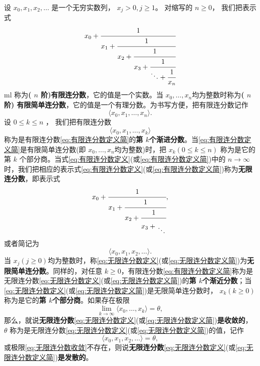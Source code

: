 \begin{definition}
	设 \( x_0, x_1, x_2, \dots \) 是一个无穷实数列， \( x_j > 0, j \geqslant 1 \)。 对缩写的 \( n \geqslant 0 \)， 我们把表示式
	\begin{equation}\label{eq:有限连分数定义}
		x_0 +
		\cfrac{1}{x_1 +
			\cfrac{1}{x_2 +
				\cfrac{1}{x_3 +
					\cfrac{1}{\ddots +
						\cfrac{1}{x_n}
					}}}}
	\end{equation}
	ml	称为\textbf{( \( n \) 阶)有限连分数}，它的值是一个实数。当 \( x_0, \dots, x_n
	\)均为整数时称为\textbf{( \( n \)阶) 有限简单连分数}，它的值是一个有理分数。为书写方便，把有限连分数记作
	\begin{equation}
		\langle x_0,x_1,\dots,x_n\rangle.
		\label{eq:有限连分数定义简}
	\end{equation}
	设 \( 0 \leqslant k \leqslant n \) ， 我们把有限连分数
	\begin{equation}
		\langle x_0, x_1, \dots, x_k\rangle
		\label{eq:第k个渐近分数}
	\end{equation}
	称为是有限连分数\eqref{eq:有限连分数定义简}的\textbf{第 \( k \)个渐进分数}。当\eqref{eq:有限连分数定义简}是有限简单连分数(即 \( x_0,\dots,x_n
	\)均为整数)时，把 \( x_k(0 \leqslant k \leqslant n) \) 称为是它的第 \( k \)
	个部分商。当式\eqref{eq:有限连分数定义}(或\eqref{eq:有限连分数定义简})中的 \( n \to \infty
	\)时，我们把相应的表示式\eqref{eq:有限连分数定义}(或\eqref{eq:有限连分数定义简})称为\textbf{无限连分数}，即表示式
	\begin{equation}\label{eq:无限连分数定义}
		x_0 + \cfrac{1}{x_1 +
			\cfrac{1}{x_2 +
				\cfrac{1}{x_3 +
					\genfrac{}{}{0pt}{}{\vphantom{1}}{\ddots}
				}}},
	\end{equation}
	或者简记为
	\begin{equation}
		\langle x_0, x_1, x_2, \dots\rangle.
		\label{eq:无限连分数定义简}
	\end{equation}
	当 \( x_j(j \geqslant 0) \)均为整数时，称\eqref{eq:无限连分数定义}(或\eqref{eq:无限连分数定义简})为\textbf{无限简单连分数}。同样的，对任意
	\( k \geqslant 0
	\)，有限连分数\eqref{eq:有限连分数定义简}称为是无限连分数\eqref{eq:无限连分数定义}(或\eqref{eq:无限连分数定义简})的\textbf{第 \( k \)个渐近分数}；当\eqref{eq:无限连分数定义}(或\eqref{eq:无限连分数定义简})是无限简单连分数时， \( x_k(k \geqslant 0)
	\)称为是它的\textbf{第 \( k \)个部分商}。如果存在极限
	\begin{equation}
		\lim_{k\to\infty}\langle x_0,\dots,x_k\rangle = \theta,
		\label{eq:无限连分数收敛}
	\end{equation}
	那么，就说\textbf{无限连分数}\eqref{eq:无限连分数定义}(或\eqref{eq:无限连分数定义简})\textbf{是收敛的}， \( \theta \)
	称为是无限连分数\eqref{eq:无限连分数定义}(或\eqref{eq:无限连分数定义简})的值，记作
	\begin{equation}
		\langle x_0,x_1,x_2,\dots\rangle = \theta,
		\label{eq:无限连分数值}
	\end{equation}
	或极限\eqref{eq:无限连分数收敛}不存在，则说\textbf{无限连分数}\eqref{eq:无限连分数定义}(或\eqref{eq:无限连分数定义简})\textbf{是发散的}。
\end{definition}
